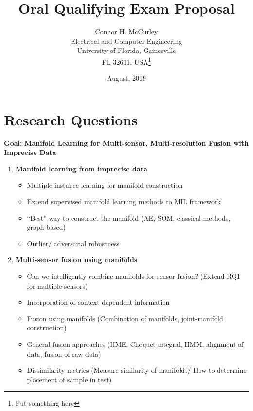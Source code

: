 \documentclass{article}[10 pt]
\begin{document}
\title{Oral Qualifying Exam Proposal}
\date{August, 2019}
\author{Connor H. McCurley\\ Electrical and Computer Engineering\\ University of Florida, Gainesville\\FL 32611, USA\thanks{Put something here}}

\maketitle
\section*{Research Questions}

\textbf{Goal:} \textbf{Manifold Learning for Multi-sensor, Multi-resolution Fusion with Imprecise Data} 

\begin{enumerate}
\item \textbf{Manifold learning from imprecise data}
	\begin{itemize}
		\item Multiple instance learning for manifold construction
		\item Extend supervised manifold learning methods to MIL framework
		\item ``Best'' way to construct the manifold (AE, SOM, classical methods, graph-based)
		\item Outlier/ adversarial robustness
	\end{itemize}

\item \textbf{Multi-sensor fusion using manifolds}
\begin{itemize}
		\item Can we intelligently combine manifolds for sensor fusion? (Extend RQ1 for multiple sensors)
 		\item Incorporation of context-dependent information
		\item Fusion using manifolds (Combination of manifolds, joint-manifold construction)
		\item General fusion approaches (HME, Choquet integral, HMM, alignment of data, fusion of raw data)
		\item Dissimilarity metrics (Measure similarity of manifolds/ How to determine placement of sample in test)
	\end{itemize}

\end{enumerate}
\end{document}
